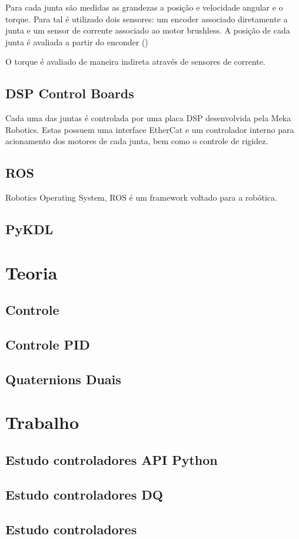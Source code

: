 Para cada junta são medidas as grandezas a posição e velocidade angular e o torque. Para tal é utilizado dois sensores: um encoder associado diretamente a junta e um sensor de corrente associado ao motor brushless. A posição de cada junta é avaliada a partir do enconder ()

O torque é avaliado de maneira indireta através de sensores de corrente.

\subsection{DSP Control Boards}

Cada uma das juntas é controlada por uma placa DSP desenvolvida pela Meka Robotics. Estas possuem uma interface EtherCat e um controlador interno para acionamento dos motores de cada junta, bem como o controle de rigidez.

\subsection{}

\subsection{ROS}

Robotics Operating System, ROS é um framework voltado para a robótica. 

\subsection{PyKDL}

\section{Teoria}

\subsection{Controle}

\subsection{Controle PID}

\subsection{Quaternions Duais}

\section{Trabalho}

\subsection{Estudo controladores API Python}

\subsection{Estudo controladores DQ}

\subsection{Estudo controladores}

